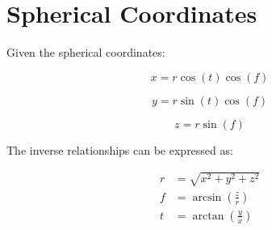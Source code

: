 \documentclass{article}
\begin{document}
\section*{Spherical Coordinates}
 	
	Given the spherical coordinates:
	
	\[
	x = r \cos(t) \cos(f)
	\]
	
	\[
	y = r \sin(t) \cos(f)
	\]
	
	\[
	z = r \sin(f)
	\]
	
	The inverse relationships can be expressed as:
	
	\begin{align*}
		r &= \sqrt{x^2 + y^2 + z^2} \\
		f &= \arcsin\left(\frac{z}{r}\right) \\
		t &= \arctan\left(\frac{y}{x}\right)
	\end{align*}
	
 
\end{document}
